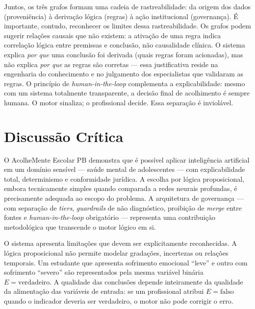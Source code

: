 \documentclass[
    12pt,
    openright,
    oneside,
    a4paper,
    english,
    brazil
]{abntex2}
\begin{document}
Juntos, os tr\^es grafos formam uma cadeia de rastreabilidade: da origem dos dados (proveni\^encia) \`a deriva\c{c}\~ao l\'ogica (regras) \`a a\c{c}\~ao institucional (governan\c{c}a). \'E importante, contudo, reconhecer os limites dessa rastreabilidade. Os grafos podem sugerir rela\c{c}\~oes causais que n\~ao existem: a ativa\c{c}\~ao de uma regra indica correla\c{c}\~ao l\'ogica entre premissas e conclus\~ao, n\~ao causalidade cl\'inica. O sistema explica \textit{por que} uma conclus\~ao foi derivada (quais regras foram acionadas), mas n\~ao explica \textit{por que} as regras s\~ao corretas --- essa justificativa reside na engenharia do conhecimento e no julgamento dos especialistas que validaram as regras. O princ\'ipio de \textit{human-in-the-loop} complementa a explicabilidade: mesmo com um sistema totalmente transparente, a decis\~ao final de acolhimento \'e sempre humana. O motor sinaliza; o profissional decide. Essa separa\c{c}\~ao \'e inviol\'avel.

\chapter{Discuss\~ao Cr\'itica}

O AcolheMente Escolar PB demonstra que \'e poss\'ivel aplicar intelig\^encia artificial em um dom\'inio sens\'ivel --- sa\'ude mental de adolescentes --- com explicabilidade total, determinismo e conformidade jur\'idica. A escolha por l\'ogica proposicional, embora tecnicamente simples quando comparada a redes neurais profundas, \'e precisamente adequada ao escopo do problema. A arquitetura de governan\c{c}a --- com separa\c{c}\~ao de \textit{tiers}, \textit{guardrails} de n\~ao diagn\'ostico, proibi\c{c}\~ao de \textit{merge} entre fontes e \textit{human-in-the-loop} obrigat\'orio --- representa uma contribui\c{c}\~ao metodol\'ogica que transcende o motor l\'ogico em si.

O sistema apresenta limita\c{c}\~oes que devem ser explicitamente reconhecidas. A l\'ogica proposicional n\~ao permite modelar grada\c{c}\~oes, incertezas ou rela\c{c}\~oes temporais. Um estudante que apresenta sofrimento emocional ``leve'' e outro com sofrimento ``severo'' s\~ao representados pela mesma vari\'avel bin\'aria $E = \text{verdadeiro}$. A qualidade das conclus\~oes depende inteiramente da qualidade da alimenta\c{c}\~ao das vari\'aveis de entrada: se um profissional atribui $E = \text{falso}$ quando o indicador deveria ser verdadeiro, o motor n\~ao pode corrigir o erro.
\end{document}
